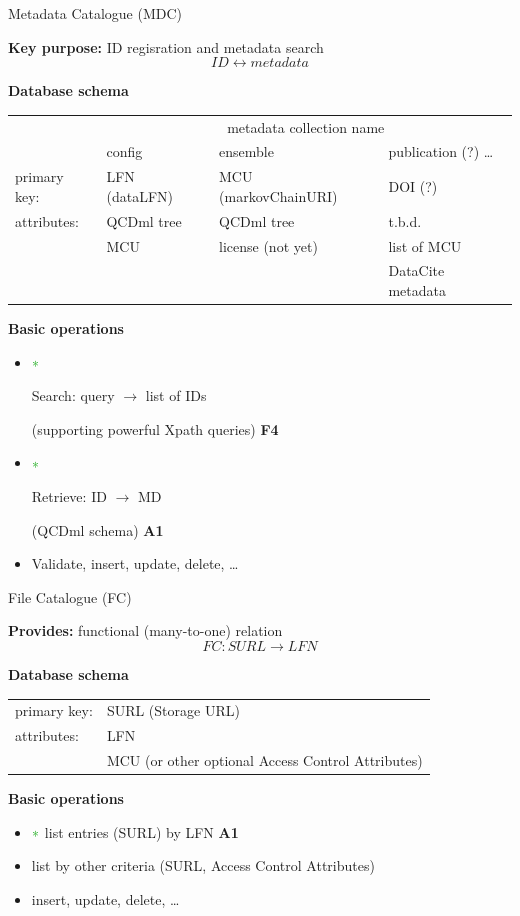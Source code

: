 \documentclass[aspectratio=169,xcolor=dvipsnames]{beamer}
\newcommand{\green}{\color{g3}}
\newcommand{\bi}{\begin{itemize}}
\newcommand{\ei}{\end{itemize}}
\begin{document}
\begin{frame}{Metadata Catalogue (MDC)}

  {\bf Key purpose:} ID regisration and metadata search
  \begin{displaymath}
        ID \longleftrightarrow metadata
  \end{displaymath}
  
  {\bf Database schema}
  \begin{center}
    {\small
      \begin{tabular}{l|l|l|l}
                      & \multicolumn{3}{c}{metadata collection name} \\
                      & config         & ensemble             & publication (?) \ldots\\
        \hline 
        primary key:  & LFN (dataLFN)  & MCU (markovChainURI) & DOI (?)    \\
        attributes:   & QCDml tree     & QCDml tree           & t.b.d.     \\
                      & MCU            & license (not yet)    & list of MCU \\
                      &                &                      & DataCite metadata
      \end{tabular}
    }
  \end{center}
  
  {\bf Basic operations}
  \bi
  \item[$\green\ast$] \parbox{14em}{\green Search: query $\to$ list of IDs} (supporting powerful Xpath queries)  \hfill {\bf F4}
  \item[$\green\ast$] \parbox{14em}{\green Retrieve: ID $\to$ MD} (QCDml schema)                                 \hfill {\bf A1}
  \item Validate, insert, update, delete, \ldots
  \ei
  
\end{frame}
\begin{frame}{File Catalogue (FC)}

  {\bf Provides:} functional (many-to-one) relation 
  \begin{displaymath}
      FC: SURL \longrightarrow LFN
  \end{displaymath}
  
  {\bf Database schema}
  \begin{center}
    \begin{tabular}{ll}
      primary key: & SURL (Storage URL)\\
      attributes:  & LFN  \\
      & MCU  {\small (or other optional Access Control Attributes)}
    \end{tabular}
  \end{center}
  
  {\bf Basic operations}
  \bi
  \item[$\green\ast$] {\green list entries (SURL) by LFN}          \hfill {\bf A1}
  \item list by other criteria (SURL, Access Control Attributes)
  \item insert, update, delete, \ldots
  \ei

\end{frame}
\end{document}
